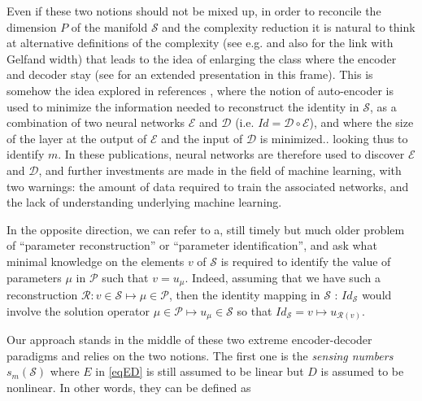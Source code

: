 \documentclass[graybox]{svmult}
\begin{document}
Even if these two notions should not be mixed up, in order to reconcile the dimension $P$ of the manifold ${\mathcal S}$ and the complexity reduction it is natural to think at alternative definitions of the complexity (see e.g. \cite{devoreActa98, devoreActa21} and also \cite{cohen2009} for the link with Gelfand width) that leads to the idea of enlarging the class where the encoder and decoder stay (see \cite{cohen2023nonlinear} for an extended presentation in this frame). This is somehow the idea explored in references \cite{Lee2020, Fresca2021}, where the notion of auto-encoder is used to minimize the information needed to reconstruct the identity in ${\mathcal S}$, as a combination of two neural networks ${\mathcal E}$ and ${\mathcal D}$ (i.e. $Id = {\mathcal D} \circ {\mathcal E}$), and where the size of the layer at the output of ${\mathcal E}$ and the input of ${\mathcal D}$ is minimized.. looking thus to identify $m$. In these publications, neural networks are therefore used to discover ${\mathcal E}$ and ${\mathcal D}$, and further investments are made in the field of machine learning, with two warnings: the amount of data required to train the associated networks, and the lack of understanding underlying machine learning.

In the opposite direction, we can refer to a, still timely but much older problem of ``parameter reconstruction'' or ``parameter identification'', and ask what minimal knowledge on the elements $v$ of ${\mathcal S}$ is required to identify the value of parameters $\mu$ in  ${\mathcal P}$ such that $v=u_\mu$. Indeed, assuming that we have such a reconstruction  ${\mathcal R} : v\in {\mathcal S}\mapsto \mu\in {\mathcal P}$, then the identity mapping in ${\mathcal S}$ : $Id_{\mathcal S}$ would involve the solution operator $\mu\in {\mathcal P}\mapsto u_\mu\in {\mathcal S}$ so that $Id_{\mathcal S} = v\mapsto u_{{\mathcal R}(v)}$.

Our approach stands in the middle of these two extreme encoder-decoder paradigms and relies on the two notions.
The first one is the {\it sensing numbers} $s_m({\mathcal S})$
where $E$ in \eqref{eqED}  is still assumed to be linear but $D$ is assumed
to be nonlinear. In other words, they can 
be defined as
\end{document}
